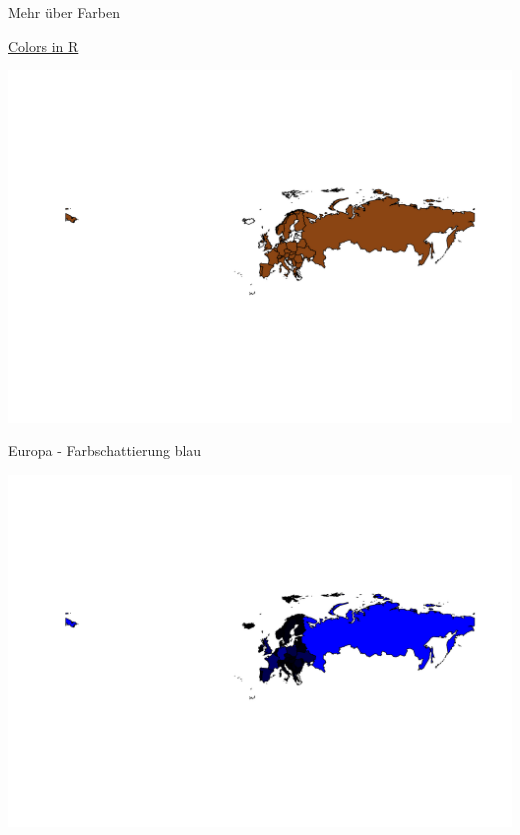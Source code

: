 \documentclass[ignorenonframetext,]{beamer}
\begin{document}
\begin{frame}{Mehr über Farben}

\href{http://www.stat.columbia.edu/~tzheng/files/Rcolor.pdf}{Colors in
R}

\includegraphics{Geomedizin_files/figure-beamer/unnamed-chunk-99-1.pdf}

\end{frame}

\begin{frame}{Europa - Farbschattierung blau}

\includegraphics{Geomedizin_files/figure-beamer/unnamed-chunk-100-1.pdf}

\end{frame}
\end{document}
